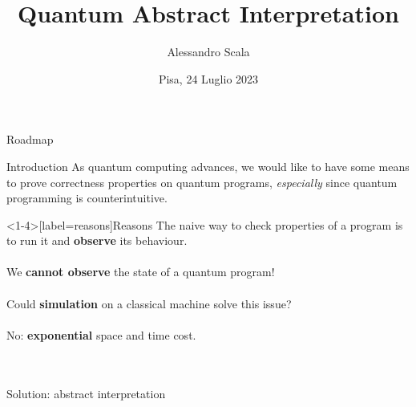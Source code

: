 \documentclass[11pt,svgnames,smaller,aspectratio=43,english]{beamer}
\title{Quantum Abstract Interpretation}
\author{Alessandro Scala}
\institute[Università di Pisa]{Università di Pisa\\Dipartimento di Informatica}
\date{Pisa, 24 Luglio 2023}
\begin{document}
\begin{frame} 
	\titlepage
\end{frame}




\begin{frame}{Roadmap}
	\tableofcontents
\end{frame}

\begin{frame}{Introduction}
	As quantum computing advances, we would like to have some means to prove correctness properties on quantum programs, \emph{especially} since quantum programming is counterintuitive.\\
\end{frame}

\begin{frame}<1-4>[label=reasons]{Reasons}
	The naive way to check properties of a program is to run it and \textbf<2->{observe} its behaviour.\\\;\\
	\pause
	\alert{We \textbf{cannot observe} the state of a quantum program!}\\\;\\
	\pause
	Could \textbf{simulation} on a classical machine solve this issue?\\\;\\
	\pause
	\alert{No: \textbf{exponential} space and time cost.}\\\;\\\;\\
	\pause
	\begin{center}
		\large \color{blue} Solution: abstract interpretation
	\end{center}
\end{frame}
\end{document}
